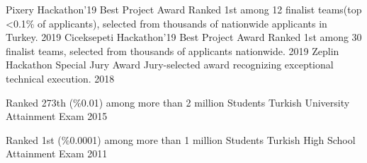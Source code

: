 


\begin{cvopenhonors}
  \cvhonor
    {Pixery Hackathon'19 Best Project Award} %
    {Ranked 1st among 12 finalist teams(top <0.1\% of applicants), selected from thousands of nationwide applicants in Turkey.} %
    {} %
    {2019} %
  \cvhonor
    {Ciceksepeti Hackathon'19 Best Project Award} %
    {Ranked 1st among 30 finalist teams, selected from thousands of applicants nationwide.} %
    {} %
    {2019} %
  \cvhonor
    {Zeplin Hackathon Special Jury Award} %
    {Jury-selected award recognizing exceptional technical execution.} %
    {} %
    {2018} %

  \cvhonor
    {Ranked 273th (\%0.01) among more than 2 million Students} %
    {Turkish University Attainment Exam} %
    {} %
    {2015} %
    \vspace{-5mm}

  \cvhonor
    {Ranked 1st (\%0.0001) among more than 1 million Students} %
    {Turkish High School Attainment Exam} %
    {} %
    {2011} %

\end{cvopenhonors}

